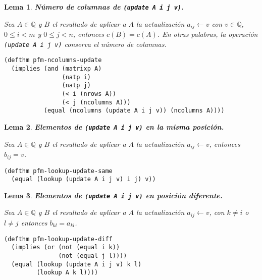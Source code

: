 \documentclass[a4paper,10pt]{article}
\newcommand{\Q}[1]{#1 \in \mathbb{Q}}
\newtheorem{lema}{{Lema}}
\begin{document}
\begin{lema} \textbf{Número de columnas de \texttt{(update A i j v)}.}\vspace{8pt}\par
Sea $\Q{A}$ y $B$ el resultado de aplicar a $A$ la actualización $a_{ij} \leftarrow v$ con $\Q{v}$, $0 \leq i < m$ y $0 \leq j < n$, entonces $c(B) = c(A)$. En otras palabras, la operación \texttt{(update A i j v)} \emph{conserva} el número de columnas.
\end{lema}

\begin{lstlisting}[language=clips]
(defthm pfm-ncolumns-update
  (implies (and (matrixp A)
                (natp i)
                (natp j)
                (< i (nrows A))
                (< j (ncolumns A)))
           (equal (ncolumns (update A i j v)) (ncolumns A))))
\end{lstlisting}

\par \vspace{16pt}

\begin{lema} \textbf{Elementos de \texttt{(update A i j v)} en la misma posición.}\vspace{8pt}\par
Sea $\Q{A}$ y $B$ el resultado de aplicar a $A$ la actualización $a_{ij} \leftarrow v$, entonces $b_{ij} = v$. 
\end{lema}

\begin{lstlisting}[language=clips]
(defthm pfm-lookup-update-same
  (equal (lookup (update A i j v) i j) v))
\end{lstlisting}

\par \vspace{16pt}

\begin{lema} \textbf{Elementos de \texttt{(update A i j v)} en posición diferente.}\vspace{8pt}\par
Sea $\Q{A}$ y $B$ el resultado de aplicar a $A$ la actualización $a_{ij} \leftarrow v$, con $k\neq i$ o $l\neq j$ entonces $b_{kl} = a_{kl}$. 
\end{lema}

\begin{lstlisting}[language=clips]
(defthm pfm-lookup-update-diff
  (implies (or (not (equal i k))
               (not (equal j l))))
  (equal (lookup (update A i j v) k l)
         (lookup A k l))))
\end{lstlisting}
\end{document}
